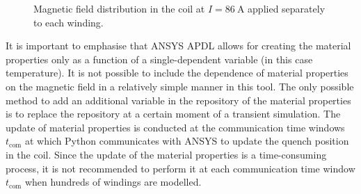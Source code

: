 \begin{figure}[H]
    \centering
    \caption{Magnetic field distribution in the coil at $I=86~\text{A}$ applied separately to each winding.}
    \label{fig:skew_quad_magnetic_interpolation_coil_ansys}
\end{figure}

It is important to emphasise that ANSYS APDL allows for creating the material properties only as a function of a single-dependent variable (in this case temperature). It is not possible to include the dependence of material properties on the magnetic field in a relatively simple manner in this tool. The only possible method to add an additional variable in the repository of the material properties is to replace the repository at a certain moment of a transient simulation. The update of material properties is conducted at the communication time windows $t_\text{com}$ at which Python communicates with ANSYS to update the quench position in the coil. Since the update of the material properties is a time-consuming process, it is not recommended to perform it at each communication time window $t_\text{com}$ when hundreds of windings are modelled.